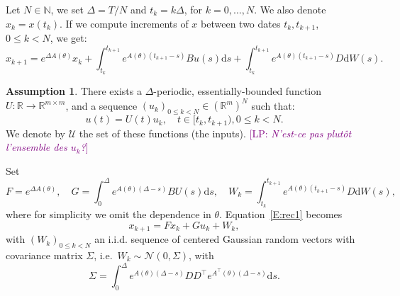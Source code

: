 \documentclass[a4paper]{article}
\newcommand{\LP}[1]{{\textcolor{purple}{[LP: \textit{#1}]}}}
\theoremstyle{definition}
\newtheorem{assumption}[theorem]{Assumption}
\theoremstyle{remark}
\newcommand{\R}{\mathbb{R}}
\newcommand{\N}{\mathbb{N}}
\newcommand{\diff}{\mathrm{d}}
\newcommand{\U}{\mathcal{U}}
\begin{document}
Let $N\in \N$, we set $\Delta=T/N$ and $t_k=k \Delta$, for $k=0,\dots, N$. We also denote $x_k=x(t_k)$. If we compute increments of $x$ between two dates $t_{k},t_{k+1}$, $0\leq k<N$, we get:
\begin{equation}\label{E:rec1}
x_{k+1}=e^{\Delta A(\theta)}x_k+\int_{t_k}^{t_{k+1}}e^{A(\theta)(t_{k+1}-s)}Bu(s)\diff s
+
\int_{t_k}^{t_{k+1}}e^{A(\theta)(t_{k+1}-s)}D \diff W(s).
\end{equation}
\begin{assumption}\label{A:periodic}
There exists a $\Delta$-periodic, essentially-bounded function $U:\R\to \R^{m\times m}$, and a sequence $(u_k)_{0\leq k<N}\in \left(\R^m\right)^N$ such that: 
\begin{equation}
    u(t)=U(t)u_k, \quad  t\in [t_k,t_{k+1}), 0\leq k< N.
\end{equation}
We denote by $\U$ the set of these functions (the inputs). \LP{ N'est-ce pas plutôt l'ensemble des $u_k$?}
\end{assumption}
Set
$$
F=e^{\Delta A(\theta)},
\quad 
G=\int_{0}^{\Delta}e^{A(\theta)(\Delta-s)}BU(s)\diff s,
\quad
W_k=\int_{t_k}^{t_{k+1}}e^{A(\theta)(t_{k+1}-s)}D \diff W(s),
$$
%
where for simplicity we omit the dependence in $\theta$.
Equation~\eqref{E:rec1} becomes 
\begin{equation}
x_{k+1}=F x_k + G u_k + W_k,
\end{equation}
with $(W_k)_{0\leq k<N}$ an i.i.d. sequence of centered Gaussian random vectors with covariance matrix $\Sigma$, i.e.\ $W_k\sim \mathcal{N}(0,\Sigma)$, with
$$
\Sigma = \int_0^\Delta e^{A(\theta)(\Delta-s)}D D^\top  e^{A^\top(\theta)(\Delta-s)}\diff s.
$$
\end{document}
